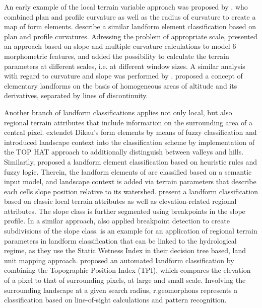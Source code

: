 \documentclass[preprint,12pt,authoryear]{elsarticle}
\begin{document}
An early example of the local terrain variable approach was  proposed by \cite{Dikau1988}, who  combined plan and profile curvature as well as the radius of curvature to create a map of form elements. \cite{Pennock1987} describe a similar landform element classification based on plan and profile curvatures. Adressing the problem of appropriate scale, \cite{Wood1996} presented an approach based on slope and multiple curvature calculations to model 6 morphometric features, and added the possibility to calculate the terrain parameters at different scales, i.e. at different window sizes. A similar analysis with regard to curvature and slope was performed by \cite{Blaszczynski1997}.  \cite{Minar2008} proposed a concept of elementary landforms on the basis of homogeneous areas  of  altitude and its derivatives, separated by lines of discontinuity.  

Another branch of landform classifications applies not only local, but also regional terrain attributes \citep{Gallant2000} that include information on the surrounding area of a central pixel. \cite{Schmidt2004} extendet Dikau's form elements by means of fuzzy classification and  introduced landscape context into the classification scheme by implementation of the TOP HAT approach \citep{Rodriguez2002} to additionally distinguish between valleys and hills.  Similarily, \cite{MacMillan2000a} proposed a landform element classification based on heuristic rules and fuzzy logic. Therein, the landform elements of \cite{Pennock1987} are classified based on a semantic input model, and landscape context is added via terrain parameters that describe each cells slope position relative to its watershed. \cite{Klingseisen2008} present a landform classification based on classic local terrain attributes as well as elevation-related regional attributes. The slope class is further segmented using breakpoints in the slope profile. In a similar approach, \cite{Matsuura2012} also applied breakpoint detection to create subdivisions of the slope class.  \cite{Hollingsworth2006} is an example for an application of regional terrain parameters in landform classification that can be linked to the hydrological regime, as they use the Static Wetness Index in their decision tree based, land unit mapping approach. \cite{Weiss2000} proposed an automated landform classification by combining the Topographic Position Index (TPI), which compares the elevation of a pixel to that of surrounding pixels, at large and small scale. Involving the surrounding landscape at a given search radius, r.geomorphons \citep{Jasiewicz2013} represents a classification based on line-of-sight calculations and pattern recognition.
\end{document}
